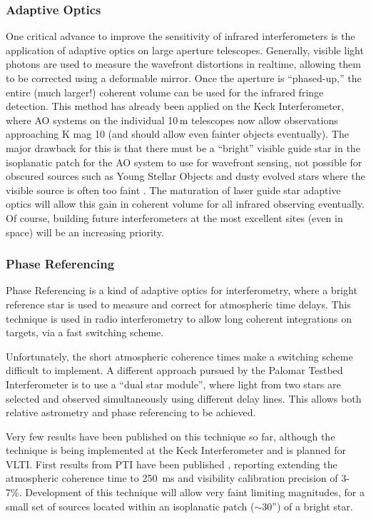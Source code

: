 \documentclass[12pt]{article}
\begin{document}
\subsubsection{Adaptive Optics}
One critical advance to improve the sensitivity of infrared
interferometers is the application of adaptive optics on large
aperture telescopes.  Generally, visible light photons are used to
measure the wavefront distortions in realtime, allowing them to be
corrected using a deformable mirror.  Once the aperture is
``phased-up,'' the entire (much larger!) coherent volume can be used
for the infrared fringe detection. This method has already been
applied on the Keck Interferometer, where AO systems on the individual
10\,m telescopes now allow observations approaching K mag 10
(and should allow even fainter objects eventually).  The major
drawback for this is that there must be a ``bright'' visible guide
star in the isoplanatic patch for the AO system to use for wavefront
sensing, not possible for obscured sources such as Young Stellar
Objects and dusty evolved stars where the visible source is often too
faint \citep[a few AO systems do have infrared wavefront sensors to
mitigate this problem, e.g.][]{naos2002}.  The maturation of laser
guide star adaptive optics will allow this gain in coherent volume for
all infrared observing eventually.  Of course, building future
interferometers at the most excellent sites (even in space) will be an
increasing priority.

\subsubsection{Phase Referencing}
Phase Referencing is a kind of adaptive optics for interferometry,
where a bright reference star is used to measure and correct for
atmospheric time delays. This technique is used in radio interferometry
to allow long coherent integrations on targets, via a fast switching scheme.

Unfortunately, the short atmospheric coherence times make a switching
scheme difficult to implement.  A different approach pursued by the Palomar
Testbed Interferometer is to use a ``dual star module'', where light
from two stars are selected and observed simultaneously using different
delay lines. This allows both relative astrometry and phase referencing
to be achieved.

Very few results have been published on this technique so far,
although the technique is being implemented at the Keck Interferometer
and is planned for VLTI. First results from PTI have been published
\citep{lane1999,lane2000a,lane2003}, reporting extending the
atmospheric coherence time to 250~ms and visibility calibration
precision of 3-7\%.  Development of this technique will allow very
faint limiting magnitudes, for a small set of sources located within
an isoplanatic patch ($\sim$30'') of a bright star.
\end{document}
